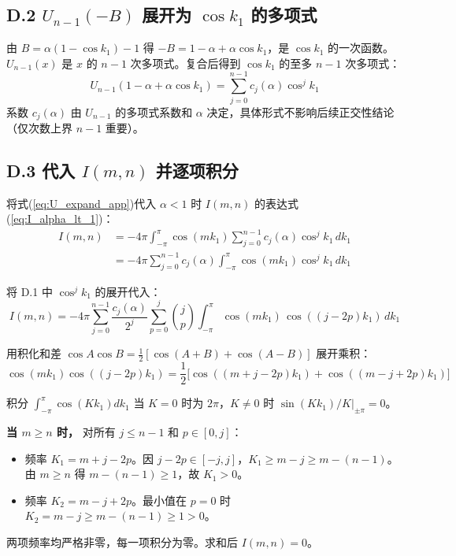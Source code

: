 \documentclass[12pt,a4paper]{ctexart}
\begin{document}
\subsection*{D.2 $U_{n-1}(-B)$ 展开为 $\cos k_1$ 的多项式}

由 $B=\alpha(1-\cos k_1)-1$ 得 $-B=1-\alpha+\alpha\cos k_1$，是 $\cos k_1$ 的一次函数。
$U_{n-1}(x)$ 是 $x$ 的 $n-1$ 次多项式。复合后得到 $\cos k_1$ 的至多 $n-1$ 次多项式：
\begin{equation}\label{eq:U_expand_app}
U_{n-1}(1-\alpha+\alpha\cos k_1)=\sum_{j=0}^{n-1}c_j(\alpha)\cos^j k_1
\end{equation}
系数 $c_j(\alpha)$ 由 $U_{n-1}$ 的多项式系数和 $\alpha$ 决定，具体形式不影响后续正交性结论（仅次数上界 $n-1$ 重要）。

\subsection*{D.3 代入 $I(m,n)$ 并逐项积分}

将式(\ref{eq:U_expand_app})代入 $\alpha<1$ 时 $I(m,n)$ 的表达式(\ref{eq:I_alpha_lt_1})：
\begin{equation}
\begin{aligned}
I(m,n)&=-4\pi\int_{-\pi}^{\pi}\cos(mk_1)\sum_{j=0}^{n-1}c_j(\alpha)\cos^j k_1\,dk_1 \\[4pt]
&=-4\pi\sum_{j=0}^{n-1}c_j(\alpha)\int_{-\pi}^{\pi}\cos(mk_1)\cos^j k_1\,dk_1
\end{aligned}
\end{equation}

将 D.1 中 $\cos^j k_1$ 的展开代入：
\begin{equation}
I(m,n)=-4\pi\sum_{j=0}^{n-1}\frac{c_j(\alpha)}{2^j}\sum_{p=0}^{j}\binom{j}{p}
\int_{-\pi}^{\pi}\cos(mk_1)\,\cos((j-2p)k_1)\,dk_1
\end{equation}

用积化和差 $\cos A\cos B=\frac12[\cos(A+B)+\cos(A-B)]$ 展开乘积：
\begin{equation}
\cos(mk_1)\cos((j-2p)k_1)
=\frac12\Big[\cos((m+j-2p)k_1)+\cos((m-j+2p)k_1)\Big]
\end{equation}

积分 $\int_{-\pi}^{\pi}\cos(Kk_1)dk_1$ 当 $K=0$ 时为 $2\pi$，$K\neq0$ 时 $\sin(Kk_1)/K|_{\pm\pi}=0$。

\textbf{当 $m\geq n$ 时，} 对所有 $j\leq n-1$ 和 $p\in[0,j]$：
\begin{itemize}
\item 频率 $K_1=m+j-2p$。因 $j-2p\in[-j,j]$，$K_1\geq m-j\geq m-(n-1)$。由 $m\geq n$ 得 $m-(n-1)\geq1$，故 $K_1>0$。
\item 频率 $K_2=m-j+2p$。最小值在 $p=0$ 时 $K_2=m-j\geq m-(n-1)\geq1>0$。
\end{itemize}
两项频率均严格非零，每一项积分为零。求和后 $I(m,n)=0$。
\end{document}
